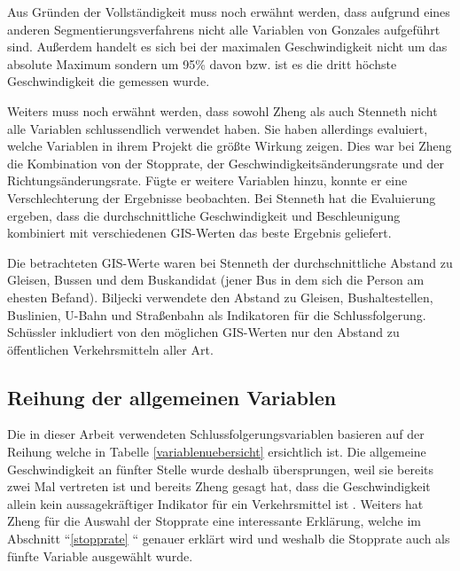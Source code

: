 Aus Gründen der Vollständigkeit muss noch erwähnt werden, dass aufgrund eines anderen Segmentierungsverfahrens nicht alle Variablen von Gonzales  \cite{gonzalez_automating_2010} aufgeführt sind. Außerdem handelt es sich bei der maximalen Geschwindigkeit nicht um das absolute Maximum sondern um 95\% davon bzw. ist es die dritt höchste Geschwindigkeit die gemessen wurde. 

Weiters muss noch erwähnt werden, dass sowohl Zheng  \cite{zheng_understanding_2010} als auch Stenneth \cite{stenneth_transportation_2011} nicht alle Variablen schlussendlich verwendet haben. Sie haben allerdings evaluiert, welche Variablen in ihrem Projekt die größte Wirkung zeigen. Dies war bei Zheng \cite{zheng_understanding_2010} die Kombination von der Stopprate, der Geschwindigkeitsänderungsrate und der Richtungsänderungsrate. Fügte er weitere Variablen hinzu, konnte er eine Verschlechterung der Ergebnisse beobachten. Bei Stenneth \cite{stenneth_transportation_2011} hat die Evaluierung ergeben, dass die durchschnittliche Geschwindigkeit und Beschleunigung kombiniert mit verschiedenen GIS-Werten das beste Ergebnis geliefert. 

Die betrachteten GIS-Werte waren bei Stenneth \cite{stenneth_transportation_2011} der durchschnittliche Abstand zu Gleisen, Bussen und dem Buskandidat (jener Bus in dem sich die Person am ehesten Befand). Biljecki verwendete den Abstand zu Gleisen, Bushaltestellen, Buslinien, U-Bahn und Straßenbahn als Indikatoren für die Schlussfolgerung. Schüssler \cite{nadine_schussler_improving_2011} inkludiert von den möglichen GIS-Werten nur den Abstand zu öffentlichen Verkehrsmitteln aller Art.

\subsection{Reihung der allgemeinen Variablen}
Die in dieser Arbeit verwendeten Schlussfolgerungsvariablen basieren auf der Reihung welche in Tabelle \ref{variablenuebersicht} ersichtlich ist. Die allgemeine Geschwindigkeit an fünfter Stelle wurde deshalb übersprungen, weil sie bereits zwei Mal vertreten ist und bereits Zheng gesagt hat, dass die Geschwindigkeit allein kein aussagekräftiger Indikator für ein Verkehrsmittel ist \cite{zheng_understanding_2010}. Weiters hat Zheng für die Auswahl der Stopprate eine interessante Erklärung, welche im Abschnitt ``\ref{stopprate} `` genauer erklärt wird und weshalb die Stopprate auch als fünfte Variable ausgewählt wurde. 

